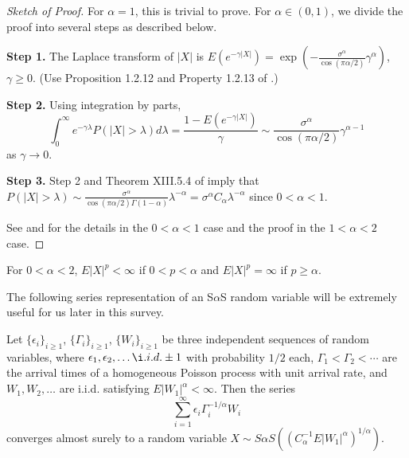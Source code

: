 \documentclass[12pt]{amsart}
\begin{document}
\begin{proof}[Sketch of Proof] For $\alpha=1$, this is trivial to prove. For $\alpha \in (0,1)$, we divide the proof into several steps as described below.

\textbf{Step 1.} The Laplace transform of $|X|$ is $E(e^{-\gamma |X|})=\exp{\left(-\frac{\sigma^\alpha}{\cos{(\pi \alpha/2)}}\gamma^\alpha\right)}$, $\gamma \geq 0$. (Use Proposition 1.2.12 and Property 1.2.13 of \cite{samorodnitsky:taqqu:1994}.) \smallskip

\textbf{Step 2.} Using integration by parts,
\[
\int_0^\infty e^{-\gamma \lambda} P(|X|>\lambda) d\lambda = \frac{1-E(e^{-\gamma |X|})}{\gamma} \sim \frac{\sigma^\alpha}{\cos{(\pi \alpha/2)}} \gamma^{\alpha-1}
\]
as $\gamma \to 0$.  \smallskip

\textbf{Step 3.} Step 2 and Theorem XIII.5.4 of \cite{feller:1971} imply that $P(|X|>\lambda) \sim \frac{\sigma^\alpha}{\cos{(\pi \alpha/2)}\Gamma(1-\alpha)} \lambda^{-\alpha}=\sigma^\alpha C_\alpha \lambda^{-\alpha}$ since $0<\alpha<1$.

See \cite{feller:1971} and \cite{samorodnitsky:taqqu:1994} for the details in the $0<\alpha<1$ case and the proof in the $1<\alpha<2$ case.
\end{proof}

\begin{cor} \label{cor_moment} For $0 < \alpha < 2$, $E|X|^p <\infty$ if $0 < p < \alpha$ and $E|X|^p =\infty$ if $p \geq \alpha$.
\end{cor}

The following series representation of an S$\alpha$S random variable will be extremely useful for us later in this survey.

\begin{thm} \label{thm_series_repn_SalphaS} Let $\{\epsilon_i\}_{i \geq 1}$, $\{\Gamma_i\}_{i \geq 1}$, $\{W_i\}_{i \geq 1}$ be three independent sequences of random variables, where $\epsilon_1, \epsilon_2, \ldots \i.i.d. \pm 1$ with probability $1/2$ each, $\Gamma_1 < \Gamma_2 < \cdots $ are the arrival times of a homogeneous Poisson process with unit arrival rate, and $W_1, W_2, \ldots$ are i.i.d. satisfying $E|W_1|^\alpha<\infty$. Then the series
\begin{equation}
\sum_{i=1}^\infty \epsilon_i \Gamma_i^{-1/\alpha} W_i \label{series_repn_SalphaS}
\end{equation}
converges almost surely to a random variable $X \sim S\alpha S\left((C_\alpha^{-1}E|W_1|^\alpha)^{1/\alpha}\right)$.
\end{thm}
\end{document}
